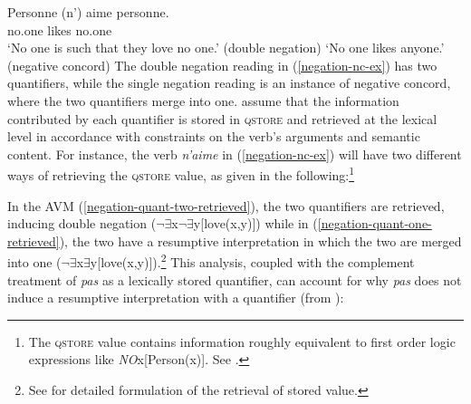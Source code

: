 \documentclass[output=paper
 	        ,biblatex
                ,babelshorthands
                ,newtxmath
                ,draftmode
                ,colorlinks, citecolor=brown
]{langscibook}
\begin{document}
\begin{exe}
\begin{xlist}
\ea \label{negation-nc-ex}
\gll Personne (n')                 aime personne.\\
     no.one   \hphantom{(}\NEG{} likes no.one\\
\glt `No one is such that they love no one.' \hfill (double negation)
\glt `No one likes anyone.' \hfill  (negative concord)
\z
%
%
The double negation reading in (\ref{negation-nc-ex}) has two quantifiers, while the single
negation reading is an instance of negative concord, where the two
quantifiers merge into one.  assume that the information contributed by
each quantifier is stored in \textsc{qstore} and retrieved at the
lexical level in accordance with constraints on the verb's arguments and semantic
content. For instance, the verb \textit{n'aime} in (\ref{negation-nc-ex}) will have two different ways of retrieving the
\textsc{qstore} value, as given in the following:\footnote{The
\textsc{qstore} value contains information
roughly equivalent to first order logic expressions like \textit{NO}x[Person(x)]. See \citet{Swart:02}.}

\eal
\ex
\label{negation-quant-two-retrieved}
\ex
\label{negation-quant-one-retrieved}
\zl
%
%
\noindent
In the AVM (\ref{negation-quant-two-retrieved}), the two quantifiers are retrieved, inducing double negation ($\neg\exists$x$\neg\exists$y[love(x,y)]) while in (\ref{negation-quant-one-retrieved}), the two have a resumptive interpretation in which the two are merged into one ($\neg\exists$x$\exists$y[love(x,y)]).\footnote{See \citet{Swart:02} for detailed formulation of the retrieval of stored value.} This analysis, coupled with the complement treatment of \textit{pas} as a lexically stored quantifier, can account
for why \emph{pas} does not induce a resumptive interpretation with a quantifier (from \citealt{Swart:02}):



\end{xlist}
\end{exe}
\end{document}
